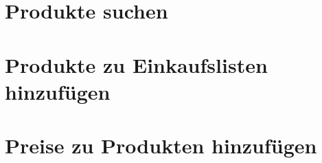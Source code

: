 \hypertarget{produkte-suchen}{%
\section{Produkte suchen}\label{produkte-suchen}}

\hypertarget{produkte-zu-einkaufslisten-hinzufuxfcgen}{%
\section{Produkte zu Einkaufslisten
hinzufügen}\label{produkte-zu-einkaufslisten-hinzufuxfcgen}}

\hypertarget{preise-zu-produkten-hinzufuxfcgen}{%
\section{Preise zu Produkten
hinzufügen}\label{preise-zu-produkten-hinzufuxfcgen}}
